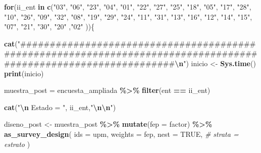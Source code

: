 \documentclass[
  12pt,
]{book}
\newenvironment{Shaded}{\begin{snugshade}}{\end{snugshade}}
\newcommand{\AttributeTok}[1]{\textcolor[rgb]{0.13,0.29,0.53}{#1}}
\newcommand{\CommentTok}[1]{\textcolor[rgb]{0.56,0.35,0.01}{\textit{#1}}}
\newcommand{\ConstantTok}[1]{\textcolor[rgb]{0.56,0.35,0.01}{#1}}
\newcommand{\ControlFlowTok}[1]{\textcolor[rgb]{0.13,0.29,0.53}{\textbf{#1}}}
\newcommand{\FunctionTok}[1]{\textcolor[rgb]{0.13,0.29,0.53}{\textbf{#1}}}
\newcommand{\NormalTok}[1]{#1}
\newcommand{\OtherTok}[1]{\textcolor[rgb]{0.56,0.35,0.01}{#1}}
\newcommand{\SpecialCharTok}[1]{\textcolor[rgb]{0.81,0.36,0.00}{\textbf{#1}}}
\newcommand{\StringTok}[1]{\textcolor[rgb]{0.31,0.60,0.02}{#1}}
\begin{document}
\begin{Shaded}
\begin{Highlighting}[]
\ControlFlowTok{for}\NormalTok{(ii\_ent }\ControlFlowTok{in} \FunctionTok{c}\NormalTok{(}\StringTok{"03"}\NormalTok{, }\StringTok{"06"}\NormalTok{, }\StringTok{"23"}\NormalTok{, }\StringTok{"04"}\NormalTok{, }\StringTok{"01"}\NormalTok{, }\StringTok{"22"}\NormalTok{, }\StringTok{"27"}\NormalTok{, }\StringTok{"25"}\NormalTok{, }\StringTok{"18"}\NormalTok{,}
  \StringTok{"05"}\NormalTok{, }\StringTok{"17"}\NormalTok{, }\StringTok{"28"}\NormalTok{, }\StringTok{"10"}\NormalTok{, }\StringTok{"26"}\NormalTok{, }\StringTok{"09"}\NormalTok{, }\StringTok{"32"}\NormalTok{, }\StringTok{"08"}\NormalTok{, }\StringTok{"19"}\NormalTok{, }\StringTok{"29"}\NormalTok{, }
  \StringTok{"24"}\NormalTok{, }\StringTok{"11"}\NormalTok{, }\StringTok{"31"}\NormalTok{, }\StringTok{"13"}\NormalTok{, }\StringTok{"16"}\NormalTok{, }\StringTok{"12"}\NormalTok{, }\StringTok{"14"}\NormalTok{, }\StringTok{"15"}\NormalTok{, }\StringTok{"07"}\NormalTok{, }\StringTok{"21"}\NormalTok{, }
  \StringTok{"30"}\NormalTok{,  }\StringTok{"20"}\NormalTok{ ,}\StringTok{"02"}\NormalTok{ ))\{}
  
  \FunctionTok{cat}\NormalTok{(}\StringTok{"\#\#\#\#\#\#\#\#\#\#\#\#\#\#\#\#\#\#\#\#\#\#\#\#\#\#\#\#\#\#\#\#\#\#\#\#\#\#\#\#\#\#\#\#\#\#\#\#\#\#\#\#\#\#\#\#\#\#\#\#\#\#\#\#\#\#\#\#\#\#\#\#\#\#\#\#\#\#\#\#\#\#\#\#\#\#\#\#\#\#\#\#\#\#\#\#\#\#\#\#\#\#\#\#\#\#\#\#\#\#\#\#}\SpecialCharTok{\textbackslash{}n}\StringTok{"}\NormalTok{)}
\NormalTok{  inicio }\OtherTok{\textless{}{-}} \FunctionTok{Sys.time}\NormalTok{()}
  \FunctionTok{print}\NormalTok{(inicio)}
  
\NormalTok{  muestra\_post }\OtherTok{=}\NormalTok{ encuesta\_ampliada }\SpecialCharTok{\%\textgreater{}\%} \FunctionTok{filter}\NormalTok{(ent }\SpecialCharTok{==}\NormalTok{ ii\_ent)}
  
  \FunctionTok{cat}\NormalTok{(}\StringTok{"}\SpecialCharTok{\textbackslash{}n}\StringTok{ Estado = "}\NormalTok{, ii\_ent,}\StringTok{"}\SpecialCharTok{\textbackslash{}n\textbackslash{}n}\StringTok{"}\NormalTok{)}

\NormalTok{  diseno\_post }\OtherTok{\textless{}{-}}\NormalTok{  muestra\_post }\SpecialCharTok{\%\textgreater{}\%} 
    \FunctionTok{mutate}\NormalTok{(}\AttributeTok{fep =}\NormalTok{ factor) }\SpecialCharTok{\%\textgreater{}\%}
    \FunctionTok{as\_survey\_design}\NormalTok{(}
      \AttributeTok{ids =}\NormalTok{ upm,}
      \AttributeTok{weights =}\NormalTok{ fep,}
      \AttributeTok{nest =} \ConstantTok{TRUE}\NormalTok{,}
      \CommentTok{\# strata = estrato}
\NormalTok{    )}
  

\end{Highlighting}
\end{Shaded}
\end{document}
